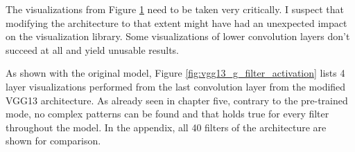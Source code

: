 \begin{figure}[!h]
{}
\label{fig:asbestos_gradcam_g}
\end{figure}

The visualizations from Figure \ref{fig:asbestos_gradcam_g} need to be taken very critically. I suspect that modifying the architecture to that extent might have had an unexpected impact on the visualization library. Some visualizations of lower convolution layers don't succeed at all and yield unusable results.

As shown with the original model, Figure \ref{fig:vgg13_g_filter_activation} lists 4 layer visualizations performed from the last convolution layer from the modified VGG13 architecture. As already seen in chapter five, contrary to the pre-trained mode, no complex patterns can be found and that holds true for every filter throughout the model. In the appendix, all 40 filters of the architecture are shown for comparison.

